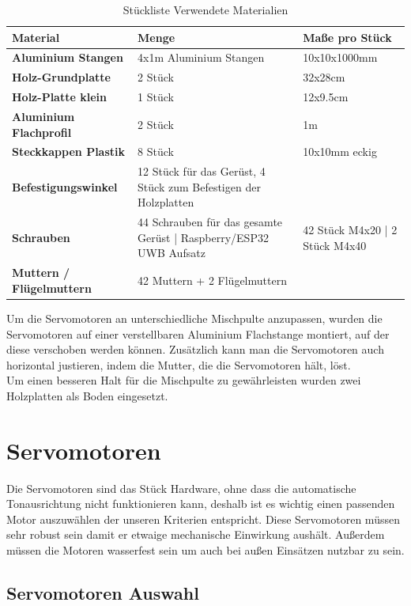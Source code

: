 \begin{table} [H]
	\begin{tabular}{ |p{3.3cm} |p{4.8cm}|p{4.8cm}| }
		\hline
		\textbf{Material} & \textbf{Menge}& \textbf{Maße pro Stück}\\
		\hline
		\textbf{Aluminium Stangen} & 4x1m Aluminium Stangen & 10x10x1000mm  \\ 
		\hline
		\textbf{Holz-Grundplatte} & 2 Stück & 32x28cm   \\  
		\hline
		\textbf{Holz-Platte klein} & 1 Stück & 12x9.5cm   \\  
		\hline
		\textbf{Aluminium Flachprofil} & 2 Stück  & 1m \\
		\hline
		\textbf{Steckkappen Plastik} & 8 Stück & 10x10mm eckig  \\
		\hline
		\textbf{Befestigungswinkel}& 12 Stück für das Gerüst, 4 Stück zum Befestigen der Holzplatten   &  \\
		\hline
		\textbf{Schrauben}& 44 Schrauben für das gesamte Gerüst | 	Raspberry/ESP32 UWB Aufsatz & 42 Stück M4x20 | 2 Stück M4x40\\
		\hline
		\textbf{Muttern / Flügelmuttern}& 42 Muttern + 2 Flügelmuttern & \\
		\hline	
	\end{tabular}
	\caption{Stückliste Verwendete Materialien} 
\end{table} 

Um die Servomotoren an unterschiedliche Mischpulte anzupassen, wurden die Servomotoren auf einer verstellbaren Aluminium Flachstange montiert, auf der diese verschoben werden können. Zusätzlich kann man die Servomotoren auch horizontal justieren, indem die Mutter, die die Servomotoren hält, löst. \\
Um einen besseren Halt für die Mischpulte zu gewährleisten wurden zwei Holzplatten als Boden eingesetzt.


\section{Servomotoren}
Die Servomotoren sind das Stück Hardware, ohne dass die automatische Tonausrichtung nicht funktionieren kann, deshalb ist es wichtig einen passenden Motor auszuwählen der unseren Kriterien entspricht. Diese Servomotoren müssen sehr robust sein damit er etwaige mechanische Einwirkung aushält. Außerdem müssen die Motoren wasserfest sein um auch bei außen Einsätzen nutzbar zu sein. 

\subsection{Servomotoren Auswahl}

